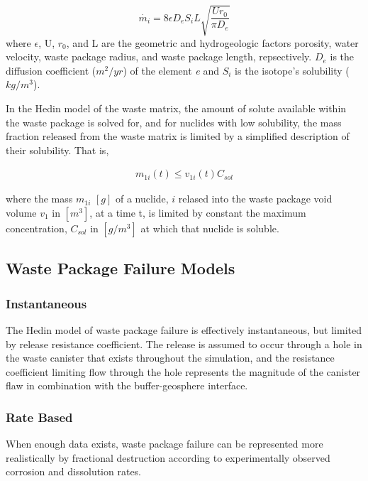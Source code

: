 \begin{equation}
\dot{m_i}=8\epsilon D_eS_iL\sqrt{\frac{Ur_0}{\pi D_e}}
\end{equation}
where $\epsilon$, U, $r_0$, and L are the geometric and hydrogeologic 
factors porosity, water velocity, waste package radius, and waste 
package length, repsectively. $D_e$ is the diffusion coefficient 
($m^2/yr$) of the element \emph{e} and $S_i$ is the isotope's 
solubility ($kg/m^3$).

In the Hedin model of the waste matrix, the amount of solute available 
within the waste package is solved for, and for nuclides with low 
solubility, the mass fraction released from the waste matrix is 
limited by a simplified description of their solubility. That is, 

\begin{align*}
  m_{1i}(t)\le v_{1i}(t)C_{sol}
\end{align*}

where the mass $m_{1i}$ $[g]$ of a nuclide, $i$ relased into the waste 
package void volume $v_1$ in $[m^3]$, at a time t, is limited by 
constant the maximum concentration, $C_{sol}$ in $[g/m^3]$ at which 
that nuclide is soluble. \cite{hedin_integrated_2002}


\subsection{Waste Package Failure Models}




\subsubsection{Instantaneous}
 
The Hedin model of waste package failure is effectively instantaneous, 
but limited by release resistance coefficient. The release is assumed  
to occur through a hole in the waste canister that exists throughout 
the simulation, and the resistance coefficient limiting flow through 
the hole represents the magnitude of the canister flaw in combination
with the buffer-geosphere interface.  \cite{hedin_integrated_2002}

\subsubsection{Rate Based}
When enough data exists, waste package failure can be represented more  
realistically by fractional destruction according to experimentally 
observed corrosion and dissolution rates. 

